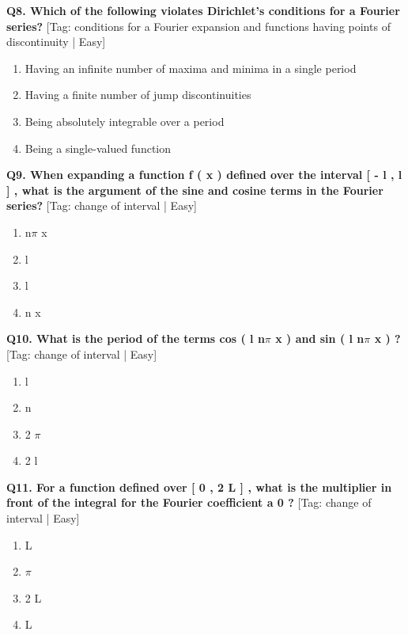 \noindent\textbf{Q8. Which of the following violates Dirichlet's conditions for a Fourier series?} \hfill [Tag: conditions for a Fourier expansion and functions having points of discontinuity | Easy]
\begin{enumerate}[label=(\alph*),topsep=2pt,itemsep=1pt,partopsep=0pt,parsep=0pt]
    \item {{Having an infinite number of maxima and minima in a single period}}
    \item {{Having a finite number of jump discontinuities}}
    \item {{Being absolutely integrable over a period}}
    \item {{Being a single-valued function}}
\end{enumerate}
\vspace{2mm}

\noindent\textbf{Q9. When expanding a function f ( x ) defined over the interval [ - l , l ] , what is the argument of the sine and cosine terms in the Fourier series?} \hfill [Tag: change of interval | Easy]
\begin{enumerate}[label=(\alph*),topsep=2pt,itemsep=1pt,partopsep=0pt,parsep=0pt]
    \item {{n$\pi$ x}}
    \item {{l}}
    \item {{l}}
    \item {{n x}}
\end{enumerate}
\vspace{2mm}

\noindent\textbf{Q10. What is the period of the terms cos ( l n$\pi$ x ) and sin ( l n$\pi$ x ) ?} \hfill [Tag: change of interval | Easy]
\begin{enumerate}[label=(\alph*),topsep=2pt,itemsep=1pt,partopsep=0pt,parsep=0pt]
    \item {{l}}
    \item {{n}}
    \item {{2 $\pi$}}
    \item {{2 l}}
\end{enumerate}
\vspace{2mm}

\noindent\textbf{Q11. For a function defined over [ 0 , 2 L ] , what is the multiplier in front of the integral for the Fourier coefficient a 0 ?} \hfill [Tag: change of interval | Easy]
\begin{enumerate}[label=(\alph*),topsep=2pt,itemsep=1pt,partopsep=0pt,parsep=0pt]
    \item {{L}}
    \item {{$\pi$}}
    \item {{2 L}}
    \item {{L}}
\end{enumerate}
\vspace{2mm}

